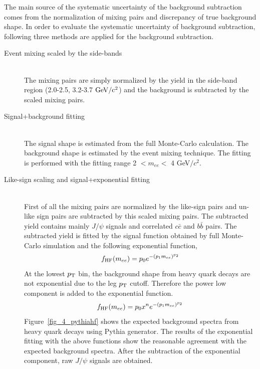 {The main source of the systematic uncertainty of the background subtraction comes from the normalization of mixing pairs and discrepancy of true background shape. 
In order to evaluate the systematic uncertainty of background subtraction, following three methods are applied for the background subtraction. 
\begin{description}
\item[Event mixing scaled by the side-bands]\mbox{}\\
  The mixing pairs are simply normalized by the yield in the side-band region (2.0-2.5, 3.2-3.7 $\rm{GeV}/c^{2}$) and the background is subtracted by the scaled mixing pairs.   
\item[Signal+background fitting]\mbox{}\\
  The signal shape is estimated from the full Monte-Carlo calculation. 
  The background shape is estimated by the event mixing technique. 
  The fitting is performed with the fitting  range 2 $<m_{ee}<$ 4 GeV$/c^{2}$.  
\item[Like-sign scaling and signal+exponential fitting]\mbox{}\\
  First of all the mixing pairs are normalized by the like-sign pairs and un-like sign pairs are subtracted by this scaled mixing pairs. 
  The subtracted yield contains mainly $J/\psi$ signals and correlated $c\bar{c}$ and $b\bar{b}$ pairs.
  The subtracted yield is fitted by the signal function obtained by full Monte-Carlo simulation and the following exponential function, 
  \begin{equation}
    f_{\rm{HF}}(m_{ee}) = p_{0} e^{-(p_{1}m_{ee})^{p_{2}}}
  \end{equation}
  At the lowest $p_{\rm{T}}$ bin,  the background shape from heavy quark decays are not exponential due to the leg $p_{\rm{T}}$ cutoff. 
  Therefore the power low component is added to the exponential function. 
  \begin{equation}
    f_{\rm{HF}}(m_{ee}) = p_{0} x^{n}e^{-(p_{1}m_{ee})^{p_{2}}}
  \end{equation}
    Figure~\ref{fig_4_pythiahf}  shows the expected background spectra from heavy quark decays using Pythia generator. 
  The results of the exponential fitting with the above functions show the reasonable agreement with the expected background spectra. 	  
  After the subtraction of the exponential component, raw $J/\psi$ signals are obtained. 
\end{description}
  \begin{figure}[!h]
   \begin{center}

\end{center}
\end{figure}}
